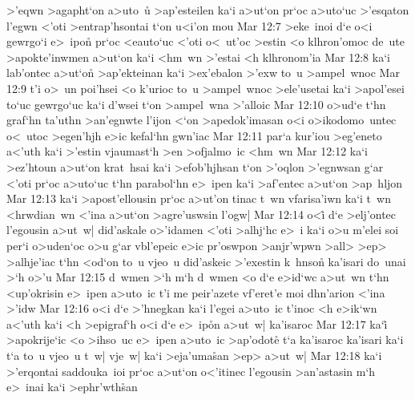 >'eqwn
>agapht`on
a>uto~u\r{}
>ap'esteilen
ka`i
a>ut`on
pr`oc
a>uto`uc
>'esqaton
l'egwn
<'oti
>entrap'hsontai
t`on
u<i'on
mou\bibvsend
\vs Mar 12:7
>eke~inoi
d`e
o<i
gewrgo`i
e>~ipon\r{}
pr`oc
<eauto`uc
<'oti
o<~ut'oc
>estin
<o
klhron'omoc
de~ute
>apokte'inwmen
a>ut`on
ka`i
<hm~wn
>'estai
<h
klhronom'ia\bibvsend
\vs Mar 12:8
ka`i
lab'ontec
a>ut`on\r{}
>ap'ekteinan
ka`i
>ex'ebalon
>'exw
to~u
>ampel~wnoc\bibvsend
\vs Mar 12:9
t'i
o>~un
poi'hsei
<o
k'urioc
to~u
>ampel~wnoc
>ele'usetai
ka`i
>apol'esei
to`uc
gewrgo`uc
ka`i
d'wsei
t`on
>ampel~wna
>'alloic\bibvsend
\vs Mar 12:10
o>ud`e
t`hn
graf`hn
ta'uthn
>an'egnwte
l'ijon
<`on
>apedok'imasan
o<i
o>ikodomo~untec
o<~utoc
>egen'hjh
e>ic
kefal`hn
gwn'iac\bibvsend
\vs Mar 12:11
par`a
kur'iou
>eg'eneto
a<'uth
ka`i
>'estin
vjaumast`h
>en
>ofjalmo~ic
<hm~wn\bibvsend
\vs Mar 12:12
ka`i
>ez'htoun
a>ut`on
krat~hsai
ka`i
>efob'hjhsan
t`on
>'oqlon
>'egnwsan
g`ar
<'oti
pr`oc
a>uto`uc
t`hn
parabol`hn
e>~ipen
ka`i
>af'entec
a>ut`on
>ap~hljon\bibvsend
\vs Mar 12:13
ka`i
>apost'ellousin
pr`oc
a>ut'on
tinac
t~wn
vfarisa'iwn
ka`i
t~wn
<hrwdian~wn
<'ina
a>ut`on
>agre'uswsin
l'ogw|\bibvsend
\vs Mar 12:14
o<i\r{}
d`e
>elj'ontec
l'egousin
a>ut~w|
did'askale
o>'idamen
<'oti
>alhj`hc
e>~i
ka`i
o>u
m'elei
soi
per`i
o>uden`oc
o>u
g`ar
vbl'epeic
e>ic
pr'oswpon
>anjr'wpwn
>all>
>ep>
>alhje'iac
t`hn
<od`on
to~u
vjeo~u
did'askeic
>'exestin
k~hnson\r{}
ka'isari
do~unai
>`h
o>'u\bibvsend
\vs Mar 12:15
d~wmen
>`h
m`h
d~wmen
<o
d`e
e>id`wc
a>ut~wn
t`hn
<up'okrisin
e>~ipen
a>uto~ic
t'i
me
peir'azete
vf'eret'e
moi
dhn'arion
<'ina
>'idw\bibvsend
\vs Mar 12:16
o<i
d`e
>'hnegkan
ka`i
l'egei
a>uto~ic
t'inoc
<h
e>ik`wn
a<'uth
ka`i
<h
>epigraf`h
o<i
d`e
e>~ip\r{o}n
a>ut~w|
ka'isaroc\bibvsend
\vs Mar 12:17
ka`i\r{}
>apokrije`ic
<o
>ihso~uc
e>~ipen
a>uto~ic
>ap'odote\r{}
t`a
ka'isaroc
ka'isari
ka`i
t`a
to~u
vjeo~u
t~w|
vje~w|
ka`i
>eja'uma\r{s}an
>ep>
a>ut~w|\bibvsend
\vs Mar 12:18
ka`i
>'erqontai
saddouka~ioi
pr`oc
a>ut`on
o<'itinec
l'egousin
>an'astasin
m`h
e>~inai
ka`i
>ephr'wth\r{s}an
